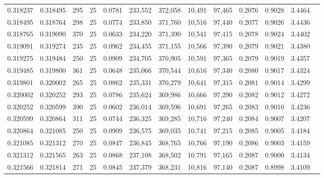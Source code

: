 \begin{tabular}{rrrrrrrrrrrrr}
0.318237 & 0.318495 &   295 &  25 &                                     0.0781 & 233,552 & 372,058 &  10,491 &  97,465 & 0.2076 & 0.9028 & 3.4464 \\
0.318495 & 0.318764 &   298 &  25 &                                     0.0774 & 233,850 & 371,760 &  10,516 &  97,440 & 0.2077 & 0.9026 & 3.4436 \\
0.318765 & 0.319090 &   370 &  25 &                                     0.0633 & 234,220 & 371,390 &  10,541 &  97,415 & 0.2078 & 0.9024 & 3.4402 \\
0.319091 & 0.319274 &   235 &  25 &                                     0.0962 & 234,455 & 371,155 &  10,566 &  97,390 & 0.2079 & 0.9021 & 3.4380 \\
0.319275 & 0.319484 &   250 &  25 &                                     0.0909 & 234,705 & 370,905 &  10,591 &  97,365 & 0.2079 & 0.9019 & 3.4357 \\
0.319485 & 0.319800 &   361 &  25 &                                     0.0648 & 235,066 & 370,544 &  10,616 &  97,340 & 0.2080 & 0.9017 & 3.4324 \\
0.319801 & 0.320002 &   265 &  25 &                                     0.0862 & 235,331 & 370,279 &  10,641 &  97,315 & 0.2081 & 0.9014 & 3.4299 \\
0.320002 & 0.320252 &   293 &  25 &                                     0.0786 & 235,624 & 369,986 &  10,666 &  97,290 & 0.2082 & 0.9012 & 3.4272 \\
0.320252 & 0.320599 &   390 &  25 &                                     0.0602 & 236,014 & 369,596 &  10,691 &  97,265 & 0.2083 & 0.9010 & 3.4236 \\
0.320599 & 0.320864 &   311 &  25 &                                     0.0744 & 236,325 & 369,285 &  10,716 &  97,240 & 0.2084 & 0.9007 & 3.4207 \\
0.320864 & 0.321085 &   250 &  25 &                                     0.0909 & 236,575 & 369,035 &  10,741 &  97,215 & 0.2085 & 0.9005 & 3.4184 \\
0.321085 & 0.321312 &   270 &  25 &                                     0.0847 & 236,845 & 368,765 &  10,766 &  97,190 & 0.2086 & 0.9003 & 3.4159 \\
0.321312 & 0.321565 &   263 &  25 &                                     0.0868 & 237,108 & 368,502 &  10,791 &  97,165 & 0.2087 & 0.9000 & 3.4134 \\
0.321566 & 0.321814 &   271 &  25 &                                     0.0845 & 237,379 & 368,231 &  10,816 &  97,140 & 0.2087 & 0.8998 & 3.4109 \\

\end{tabular}
